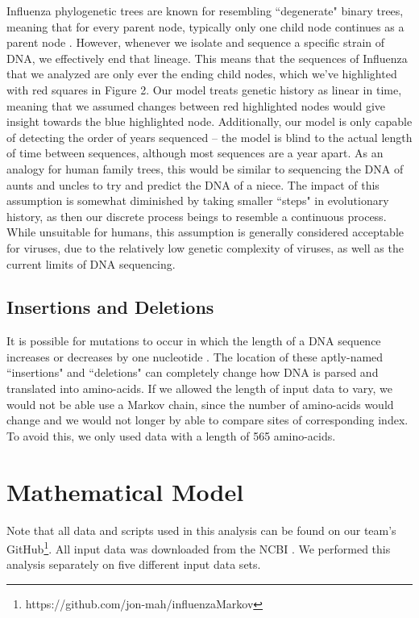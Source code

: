 \documentclass[12pt]{article}
\begin{document}
\begin{multicols}{2}
Influenza phylogenetic trees are known for resembling ``degenerate" binary trees, meaning that for every parent node, typically only one child node continues as a parent node \citep{taubenberger1997initial}. However, whenever we isolate and sequence a specific strain of DNA, we effectively end that lineage. This means that the sequences of Influenza that we analyzed are only ever the ending child nodes, which we've highlighted with red squares in Figure 2. Our model treats genetic history as linear in time, meaning that we assumed changes between red highlighted nodes would give insight towards the blue highlighted node. Additionally, our model is only capable of detecting the order of years sequenced -- the model is blind to the actual length of time between sequences, although most sequences are a year apart. As an analogy for human family trees, this would be similar to sequencing the DNA of aunts and uncles to try and predict the DNA of a niece. The impact of this assumption is somewhat diminished by taking smaller ``steps" in evolutionary history, as then our discrete process beings to resemble a continuous process. While unsuitable for humans, this assumption is generally considered acceptable for viruses, due to the relatively low genetic complexity of viruses, as well as the current limits of DNA sequencing. 

\subsection{Insertions and Deletions}
It is possible for mutations to occur in which the length of a DNA sequence increases or decreases by one nucleotide \citep{brendel1986linguistics}. The location of these aptly-named ``insertions" and ``deletions" can completely change how DNA is parsed and translated into amino-acids. If we allowed the length of input data to vary, we would not be able use a Markov chain, since the number of amino-acids would change and we would not longer by able to compare sites of corresponding index. To avoid this, we only used data with a length of 565 amino-acids.

\section{Mathematical Model}
Note that all data and scripts used in this analysis can be found on our team's GitHub\footnote{https://github.com/jon-mah/influenzaMarkov}. All input data was downloaded from the NCBI \citep{bao2008influenza}. We performed this analysis separately on five different input data sets.


\end{multicols}
\end{document}

